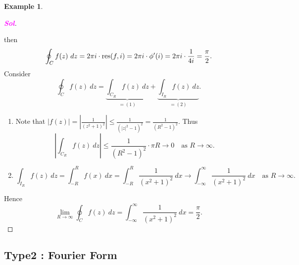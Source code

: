 \documentclass[12pt,openany]{book}
\theoremstyle{definition}
\newtheorem{example}{Example}[section]
\newcommand{\abs}[1]{\left\lvert #1 \right\rvert}
\newcommand{\sol}{\textcolor{magenta}{\bf Sol}}
\newcommand{\res}{\textnormal{res}}
\begin{document}
\begin{example}
\begin{proof}[\sol]
\begin{center}
			\end{center} then \[
			\oint_C f(z)\ dz=2\pi i\cdot\res(f,i)=2\pi i\cdot\phi'(i)=2\pi i\cdot\frac{1}{4i}=\frac{\pi}{2}.
			\] Consider \[
			\oint_C f(z)\ dz=\underbrace{\int_{C_R}f(z)\ dz}_{=(1)}+\underbrace{\int_{I_R}f(z)\ dz}_{=(2)}.
			\] \begin{enumerate}[(1)]
				\item Note that $\abs{f(z)}=\abs{\frac{1}{(z^2+1)^2}}\leq\frac{1}{(\abs{z}^2-1)^2}=\frac{1}{(R^2-1)^2}$. Thus \[
				\abs{\int_{C_R}f(z)\ dz}\leq\frac{1}{(R^2-1)^2}\cdot\pi R\to 0\quad\text{as $R\to\infty$}.
				\]
				\item \[
				\int_{I_R}f(z)\ dz=\int_{-R}^R f(x)\ dx=\int_{-R}^R\frac{1}{(x^2+1)^2}\ dx\to\int_{-\infty}^{\infty}\frac{1}{(x^2+1)^2}\ dx\quad\text{as $R\to\infty$}.
				\]
			\end{enumerate} Hence \[
			\lim\limits_{R\to\infty}\oint_C f(z)\ dz=\int_{-\infty}^\infty\frac{1}{(x^2+1)^2}\ dx=\frac{\pi}{2}.
			\]
		\end{proof}
	\end{example}
	
	\subsection{Type2 : Fourier Form}
	
\end{document}
